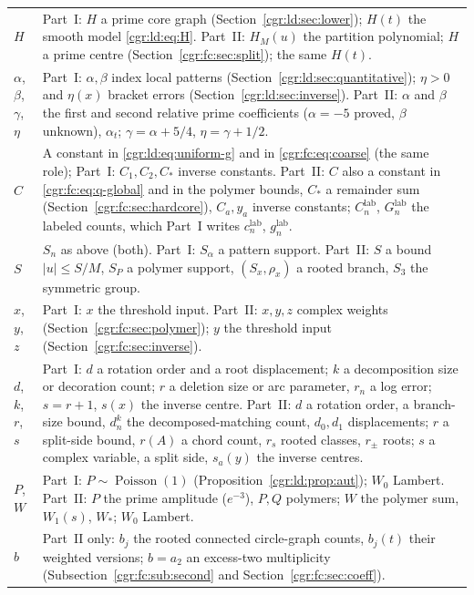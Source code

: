 \documentclass[11pt,letterpaper]{article}
\numberwithin{equation}{section}
\theoremstyle{definition}\newtheorem{definition}[theorem]{Definition}
\theoremstyle{remark}\newtheorem{remark}[theorem]{Remark}
\DeclareMathOperator{\Poi}{Poisson}
\begin{document}
\begin{longtable}{@{}>{\raggedright\arraybackslash}p{} >{\raggedright\arraybackslash}p{}@{}}
$H$ & Part~I: $H$ a prime core graph (Section~\ref{cgr:ld:sec:lower}); $H(t)$ the smooth model \eqref{cgr:ld:eq:H}. Part~II: $H_M(u)$ the partition polynomial; $H$ a prime centre (Section~\ref{cgr:fc:sec:split}); the same $H(t)$.\\
$\alpha$, $\beta$, $\gamma$, $\eta$ & Part~I: $\alpha,\beta$ index local patterns (Section~\ref{cgr:ld:sec:quantitative}); $\eta>0$ and $\eta(x)$ bracket errors (Section~\ref{cgr:ld:sec:inverse}). Part~II: $\alpha$ and $\beta$ the first and second relative prime coefficients ($\alpha=-5$ proved, $\beta$ unknown), $\alpha_t$; $\gamma=\alpha+5/4$, $\eta=\gamma+1/2$.\\
$C$ & A constant in \eqref{cgr:ld:eq:uniform-g} and in \eqref{cgr:fc:eq:coarse} (the same role); Part~I: $C_1,C_2,C_*$ inverse constants. Part~II: $C$ also a constant in \eqref{cgr:fc:eq:q-global} and in the polymer bounds, $C_*$ a remainder sum (Section~\ref{cgr:fc:sec:hardcore}), $C_a,y_a$ inverse constants; $C_n^{\mathrm{lab}}$, $G_n^{\mathrm{lab}}$ the labeled counts, which Part~I writes $c_n^{\mathrm{lab}}$, $g_n^{\mathrm{lab}}$.\\
$S$ & $S_n$ as above (both). Part~I: $S_\alpha$ a pattern support. Part~II: $S$ a bound $|u|\le S/M$, $S_P$ a polymer support, $(S_x,\rho_x)$ a rooted branch, $S_3$ the symmetric group.\\
$x$, $y$, $z$ & Part~I: $x$ the threshold input. Part~II: $x,y,z$ complex weights (Section~\ref{cgr:fc:sec:polymer}); $y$ the threshold input (Section~\ref{cgr:fc:sec:inverse}).\\
$d$, $k$, $r$, $s$ & Part~I: $d$ a rotation order and a root displacement; $k$ a decomposition size or decoration count; $r$ a deletion size or arc parameter, $r_n$ a log error; $s=r+1$, $s(x)$ the inverse centre. Part~II: $d$ a rotation order, a branch-size bound, $d_n^k$ the decomposed-matching count, $d_0,d_1$ displacements; $r$ a split-side bound, $r(A)$ a chord count, $r_s$ rooted classes, $r_\pm$ roots; $s$ a complex variable, a split side, $s_a(y)$ the inverse centres.\\
$P$, $W$ & Part~I: $P\sim\Poi(1)$ (Proposition~\ref{cgr:ld:prop:aut}); $W_0$ Lambert. Part~II: $P$ the prime amplitude ($e^{-3}$), $P,Q$ polymers; $W$ the polymer sum, $W_1(s)$, $W_*$; $W_0$ Lambert.\\
$b$ & Part~II only: $b_j$ the rooted connected circle-graph counts, $b_j(t)$ their weighted versions; $b=a_2$ an excess-two multiplicity (Subsection~\ref{cgr:fc:sub:second} and Section~\ref{cgr:fc:sec:coeff}).\\
\bottomrule
\end{longtable}
\addtocounter{table}{-1}%
\endgroup
\end{document}

